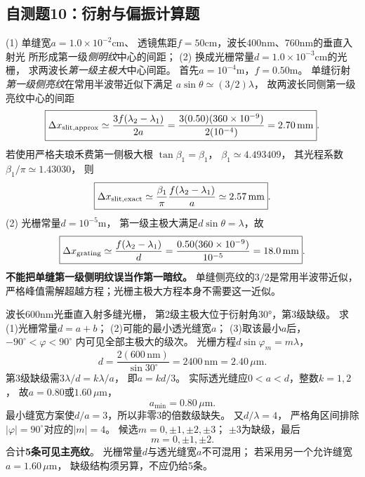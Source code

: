 \subsection{自测题10：衍射与偏振计算题}

\problemtext (1) 单缝宽$a=1.0\times10^{-2}$cm、
透镜焦距$f=50$cm，波长400nm、760nm的垂直入射光
所形成第一级\emph{侧明纹}中心的间距；
(2) 换成光栅常量$d=1.0\times10^{-3}$cm的光栅，
求两波长\emph{第一级主极大}中心间距。
\workings
首先$a=10^{-4}$m，$f=0.50$m。
单缝衍射\emph{第一级侧亮纹}在常用半波带近似下满足
$a\sin\theta\simeq(3/2)\lambda$，
故两波长同侧第一级亮纹中心的间距
\[
\boxed{\Delta x_{\rm slit,approx}
\simeq\frac{3f(\lambda_2-\lambda_1)}{2a}
=\frac{3(0.50)(360\times10^{-9})}{2(10^{-4})}
=2.70\,\mathrm{mm}}.
\]
若使用严格夫琅禾费第一侧极大根
$\tan\beta_1=\beta_1$，
$\beta_1\simeq4.493409$，
其光程系数$\beta_1/\pi\simeq1.43030$，
则
\[
\boxed{\Delta x_{\rm slit,exact}
\simeq\frac{\beta_1}{\pi}
\frac{f(\lambda_2-\lambda_1)}a
\simeq2.57\,\mathrm{mm}}.
\]
(2) 光栅常量$d=10^{-5}$m，
第一级主极大满足$d\sin\theta=\lambda$，故
\[
\boxed{\Delta x_{\rm grating}\simeq
\frac{f(\lambda_2-\lambda_1)}d
=\frac{0.50(360\times10^{-9})}{10^{-5}}
=18.0\,\mathrm{mm}}.
\]
\crosscheck \textbf{不能把单缝第一级侧明纹误当作第一暗纹。}
单缝侧亮纹的$3/2$是常用半波带近似，
严格峰值需解超越方程；光栅主极大方程本身不需要这一近似。

\problemtext 波长600nm光垂直入射多缝光栅，
第2级主极大位于衍射角30°，第3级缺级。
求(1)光栅常量$d=a+b$；
(2)可能的最小透光缝宽$a$；
(3)取该最小$a$后，$-90^\circ<\varphi<90^\circ$
内可见全部主极大的级次。
\workings
光栅方程$d\sin\varphi_m=m\lambda$，
\[
\boxed{d=\frac{2(600\,\mathrm{nm})}{\sin30^\circ}
=2400\,\mathrm{nm}=2.40\,\mu\mathrm m}.
\]
第3级缺级需$3\lambda/d=k\lambda/a$，
即$a=kd/3$。
实际透光缝应$0<a<d$，整数$k=1,2$，
故$a=0.80$或$1.60\,\mu$m，
\[
\boxed{a_{\min}=0.80\,\mu\mathrm m}.
\]
最小缝宽方案使$d/a=3$，所以非零3的倍数级缺失。
又$d/\lambda=4$，
严格角区间排除$|\varphi|=90^\circ$对应的$|m|=4$。
候选$m=0,\pm1,\pm2,\pm3$；
$\pm3$为缺级，最后
\[
\boxed{m=0,\pm1,\pm2}.
\]
合计\textbf{5条可见主亮纹}。
\crosscheck 光栅常量$d$与透光缝宽$a$不可混用；
若采用另一个允许缝宽$a=1.60\,\mu$m，
缺级结构须另算，不应仍给5条。

